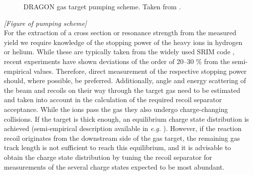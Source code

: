 \begin{figure}
\caption{DRAGON gas target pumping scheme. Taken from \cite{hutc03b}.}
\label{fig:dragon_pumping}
\end{figure}
\emph{[Figure of pumping scheme]} \\
For the extraction of a cross section or resonance strength from the measured yield we require knowledge of the stopping power of the heavy ions in hydrogen or helium. While these are typically taken from the widely used SRIM code \cite{zieg}, recent experiments \cite{grei04} have shown deviations of the order of 20--30 \% from the semi-empirical values. Therefore, direct measurement of the respective stopping power should, where possible, be preferred. Additionally, angle and energy scattering of the beam and recoils on their way through the target gas need to be estimated and taken into account in the calculation of the required recoil separator acceptance. While the ions pass the gas they also undergo charge-changing collisions. If the target is thick enough, an equilibrium charge state distribution is achieved (semi-empirical description available in {\it e.g.} \cite{liu03}). However, if the reaction recoil originates from the downstream side of the gas target, the remaining gas track length is not sufficient to reach this equilibrium, and it is advisable to obtain the charge state distribution by tuning the recoil separator for measurements of the several charge states expected to be most abundant.\\

